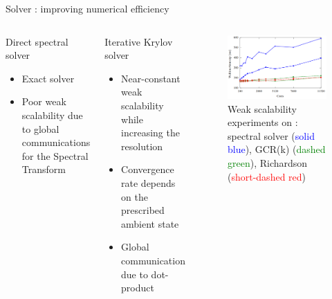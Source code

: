 \documentclass[10pt]{beamer}
\begin{document}
\begin{frame}{Solver : improving numerical efficiency}

    \vspace{-0.5cm}

    \begin{columns}
        \begin{block}{Direct spectral solver}
            \begin{itemize}
                \item[\textcolor{blue}{\faIcon{plus}}] \small Exact solver
                \item[\textcolor{red}{\faIcon{minus}}] Poor weak scalability due to global communications for the Spectral Transform 
            \end{itemize}
        \end{block}
    
        \begin{block}{Iterative Krylov solver}
            \begin{itemize}
                \item[\textcolor{blue}{\faIcon{plus}}] \small Near-constant weak scalability while increasing the resolution                
                \item[\textcolor{red}{\faIcon{minus}}] \small Convergence rate depends on the prescribed ambient state
                \item[\textcolor{red}{\faIcon{minus}}] \small Global communication due to dot-product
            \end{itemize}
        \end{block}

        \begin{figure}
            \centering
            \includegraphics[scale=0.25]{png/weak_scalability_beaufix.png}
            \caption{\footnotesize  Weak scalability experiments on : spectral solver (\textcolor{blue}{solid blue}), GCR(k) (\textcolor{green}{dashed green}), 
            Richardson (\textcolor{red}{short-dashed red})}
            \label{fig:evolution_chaotique}
        \end{figure}
    \end{columns}


\end{frame}
\end{document}
